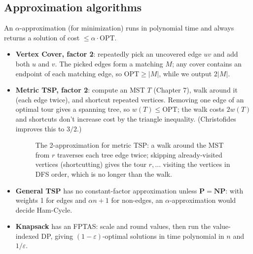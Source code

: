 \subsection{Approximation algorithms}
An $\alpha$-approximation (for minimization) runs in polynomial time and always returns a solution of cost $\le\alpha\cdot\mathrm{OPT}$.
\begin{itemize}
  \item \textbf{Vertex Cover, factor 2}: repeatedly pick an uncovered edge $uv$ and add both $u$ and $v$. The picked edges form a matching $M$; any cover contains an
        endpoint of each matching edge, so $\mathrm{OPT}\ge|M|$, while we output $2|M|$.
  \item \textbf{Metric TSP, factor 2}: compute an MST $T$ (Chapter 7), walk around it (each edge twice), and shortcut repeated vertices. Removing one edge of an optimal tour
        gives a spanning tree, so $w(T)\le\mathrm{OPT}$; the walk costs $2w(T)$ and shortcuts don't increase cost by the triangle inequality. (Christofides improves this to $3/2$.)

\begin{figure}[H]
\centering
{}
\caption{The 2-approximation for metric TSP: a walk around the MST from
$r$ traverses each tree edge twice; skipping already-visited vertices
(shortcutting) gives the tour $r, \ldots$ visiting the vertices in DFS
order, which is no longer than the walk.}
\end{figure}
  \item \textbf{General TSP} has no constant-factor approximation unless $\mathbf P=\mathbf{NP}$: with weights 1 for edges and $\alpha n+1$ for non-edges, an $\alpha$-approximation would decide Ham-Cycle.
  \item \textbf{Knapsack} has an FPTAS: scale and round values, then run the value-indexed DP, giving $(1-\varepsilon)$-optimal solutions in time polynomial in $n$ and $1/\varepsilon$.
\end{itemize}


